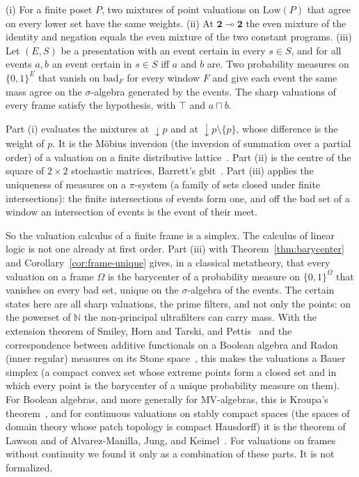 \begin{theorem}
\label{thm:cat-simplex}
(i) For a finite poset $P$, two mixtures of point valuations on
$\mathrm{Low}(P)$ that agree on every lower set have the same weights.
(ii) At $\mathbf{2} \multimap \mathbf{2}$ the even mixture of the
identity and negation equals the even mixture of the two constant
programs.
(iii) Let $(E, S)$ be a presentation with an event certain in every
$s \in S$, and for all events $a, b$ an event certain in $s \in S$ iff
$a$ and $b$ are. Two probability measures on $\{0,1\}^{E}$ that vanish
on $\mathrm{bad}_F$ for every window $F$ and give each event the same
mass agree on the $\sigma$-algebra generated by the events. The sharp
valuations of every frame satisfy the hypothesis, with $\top$ and
$a \sqcap b$.
\end{theorem}

\noindent
Part (i) evaluates the mixtures at $\downarrow\! p$ and at
$\downarrow\! p \setminus \{p\}$, whose difference is the weight of $p$.
It is the Möbius inversion (the inversion of summation over a partial
order) of a valuation on a finite distributive lattice~\cite{rota1964,geissinger1973}. Part (ii) is the centre of the
square of $2 \times 2$ stochastic matrices, Barrett's gbit~\cite{barrett2007}.
Part (iii) applies the uniqueness of measures on a $\pi$-system (a
family of sets closed under finite intersections): the
finite intersections of events form one, and off the bad set of a window
an intersection of events is the event of their meet.

So the valuation calculus of a finite frame is a simplex. The calculus
of linear logic is not one already at first order. Part (iii) with
Theorem~\ref{thm:barycenter} and Corollary~\ref{cor:frame-unique} gives,
in a classical metatheory, that every valuation on a frame $\Omega$ is the
barycenter of a probability measure on $\{0,1\}^{\Omega}$ that vanishes
on every bad set, unique on the $\sigma$-algebra of the events. The certain states here are all sharp
valuations, the prime filters, and not only the points: on the powerset
of $\mathbb{N}$ the non-principal ultrafilters can carry mass. With the
extension theorem of Smiley, Horn and Tarski, and
Pettis~\cite{smiley1944,horn-tarski1948,pettis1951} and the
correspondence between additive functionals on a Boolean algebra and
Radon (inner regular) measures on its Stone space~\cite{fremlin2003},
this makes the valuations a Bauer simplex (a compact convex set whose
extreme points form a closed set and in which every point is the
barycenter of a unique probability measure on them). For Boolean algebras, and more generally for
MV-algebras, this is Kroupa's theorem~\cite{kroupa2006}, and for
continuous valuations on stably compact spaces (the spaces of domain
theory whose patch topology is compact Hausdorff) it is the theorem of
Lawson and of Alvarez-Manilla, Jung, and Keimel~\cite{ajk2004}. For
valuations on frames without continuity we found it only as a
combination of these parts. It is not formalized.

